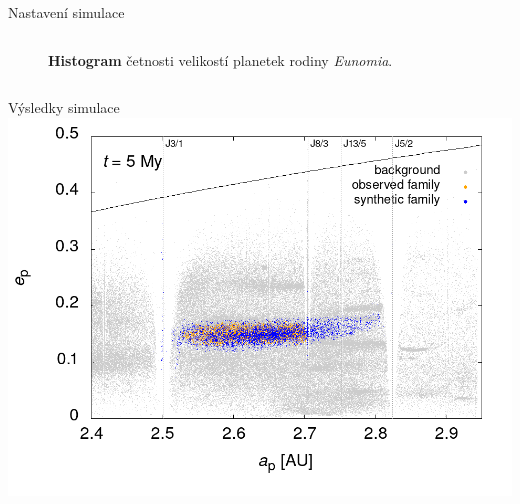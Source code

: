\documentclass[xcolor=dvipsnames]{beamer}
\begin{document}
\begin{frame}[t]{\secname}{Nastavení simulace}
\begin{columns}
\begin{column}{0.4\textwidth}
\begin{figure}
			\caption{\textbf{Histogram} četnosti velikostí planetek rodiny \textit{Eunomia}.}
		\end{figure}
	\end{column}
	\end{columns}
\end{frame}

\begin{frame}[t]{\secname}{Výsledky simulace}
	\centering
	\includegraphics[width=0.8\paperwidth]{../obr/ae_5_trans.png}
\end{frame}
\end{document}
